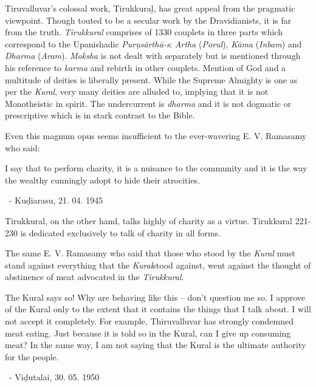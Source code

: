 Tiruvalluvar’s colossal work, Tirukkuraḻ, has great appeal from the pragmatic viewpoint. Though touted to be a secular work by the Dravidianists, it is far from the truth. \textit{Tirukkural} comprises of 1330 couplets in three parts which correspond to the Upanishadic \textit{Purụsārthā-s}: \textit{Artha} (\textit{Porul}), \textit{Kāma} (\textit{Inbam}) and \textit{Dharma} (\textit{Aram}). \textit{Moksha} is not dealt with separately but is mentioned through his reference to \textit{karma} and rebirth in other couplets. Mention of God and a multitude of deities is liberally present. While the Supreme Almighty is one as per the \textit{Kural}, very many deities are alluded to, implying that it is not Monotheistic in spirit. The undercurrent is \textit{dharma} and it is not dogmatic or prescriptive which is in stark contrast to the Bible.

Even this magnum opus seems insufficient to the ever-wavering E. V. Ramasamy who said:

\begin{myquote}
I say that to perform charity, it is a nuisance to the community and it is the way the wealthy cunningly adopt to hide their atrocities.

~\hfill - Kuḍiarasu, 21. 04. 1945
\end{myquote}

Tirukkural, on the other hand, talks highly of charity as a virtue. Tirukkural 221-230 is dedicated exclusively to talk of charity in all forms.

The same E. V. Ramasamy who said that those who stood by the \textit{Kural} must stand against everything that the \textit{Kural}stood against, went against the thought of abstinence of meat advocated in the \textit{Tirukkural}.

\begin{myquote}
The Kural says so! Why are behaving like this – don’t question me so. I approve of the Kural only to the extent that it contains the things that I talk about. I will not accept it completely. For example, Thiruvalluvar has strongly condemned meat eating. Just because it is told so in the Kural, can I give up consuming meat? In the same way, I am not saying that the Kural is the ultimate authority for the people.

~\hfill - Viḍutalai, 30. 05. 1950
\end{myquote}

